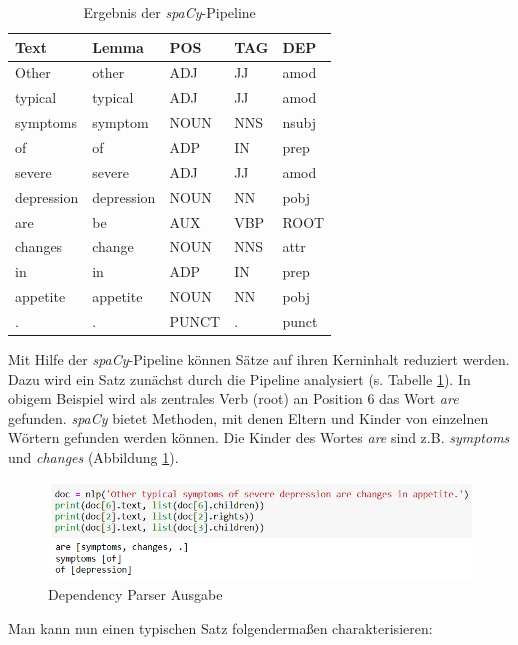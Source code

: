 \begin{table}
\centering
\begin{tabular}{lllll}
\hline
\textbf{Text}	& \textbf{Lemma}	& \textbf{POS} & \textbf{TAG} & \textbf{DEP} \\
\hline
Other & other & ADJ & JJ & amod \\
typical & typical & ADJ & JJ & amod \\
symptoms & symptom & NOUN & NNS & nsubj \\
of & of & ADP & IN & prep \\
severe & severe & ADJ & JJ & amod \\
depression & depression & NOUN & NN & pobj \\
are & be & AUX & VBP & ROOT \\
changes & change & NOUN & NNS & attr \\
in & in & ADP & IN & prep \\
appetite & appetite & NOUN & NN & pobj \\
.  & . & PUNCT & . & punct \\
\hline
\end{tabular}
\caption{Ergebnis der \emph{spaCy}-Pipeline}
\label{tab:spaCy2}
\end{table}

Mit Hilfe der \emph{spaCy}-Pipeline können Sätze auf ihren Kerninhalt reduziert werden. Dazu wird ein Satz zunächst durch die Pipeline analysiert (s. Tabelle \ref{tab:spaCy2}). In obigem Beispiel wird als zentrales Verb (root) an Position 6 das Wort \emph{are} gefunden. \emph{spaCy} bietet Methoden, mit denen Eltern und Kinder von einzelnen Wörtern gefunden werden können. Die Kinder des Wortes \emph{are} sind z.B. \emph{symptoms} und \emph{changes} (Abbildung \ref{fig:typ_phrase}). 

\begin{figure}[h]
    \centering
    \includegraphics[width=\textwidth]{pictures/Dep_Parser_Text.png}
    \caption{Dependency Parser Ausgabe}
    \label{fig:typ_phrase}
\end{figure}

Man kann nun einen typischen Satz folgendermaßen charakterisieren:

